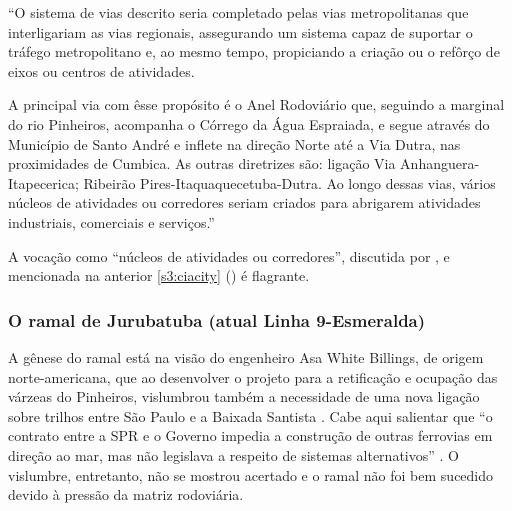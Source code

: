 \documentclass[
article,			%
11pt,				%
oneside,			%
a4paper,			%
english,			%
brazil,				%
sumario=tradicional
]{abntex2}
\begin{document}
	\begin{citacao}
		``O sistema de vias descrito seria completado pelas vias metropolitanas que interligariam as vias regionais, assegurando um sistema capaz de suportar o tráfego metropolitano e, ao mesmo tempo, propiciando a criação ou o refôrço de eixos ou centros de atividades.
		
		A principal via com êsse propósito é o Anel Rodoviário que, seguindo a marginal do rio Pinheiros, acompanha o Córrego da Água Espraiada, e segue através do Município de Santo André e inflete na direção Norte até a Via Dutra, nas proximidades de Cumbica. As outras diretrizes são: ligação Via Anhanguera-Itapecerica; Ribeirão Pires-Itaquaquecetuba-Dutra. Ao longo dessas vias, vários núcleos de atividades ou corredores seriam criados para abrigarem atividades industriais, comerciais e serviços.''
	\end{citacao}
	
	A vocação como ``núcleos de atividades ou corredores'', discutida por , e mencionada na anterior \autoref{s3:ciacity} () é flagrante.
	
	\subsubsection{O ramal de Jurubatuba (atual Linha 9-Esmeralda)} \label{s3:linha9}
	
	A gênese do ramal está na visão do engenheiro Asa White Billings, de origem norte-americana, que ao desenvolver o projeto para a retificação e ocupação das várzeas do Pinheiros, vislumbrou também a necessidade de uma nova ligação sobre trilhos entre São Paulo e a Baixada Santista \cite[p. 61]{franco2005a}. Cabe aqui salientar que ``o contrato entre a SPR e o Governo impedia a construção de outras ferrovias em direção ao mar, mas não legislava a respeito de sistemas alternativos'' \cite[p. 61]{franco2005a}. O vislumbre, entretanto, não se mostrou acertado e o ramal não foi bem sucedido devido à pressão da matriz rodoviária.
	
\end{document}
